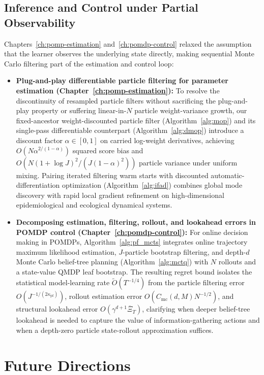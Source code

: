 \begin{aigenblock}
\subsection{Inference and Control under Partial Observability}

Chapters~\ref{ch:pomp-estimation} and~\ref{ch:pomdp-control} relaxed the assumption that the learner observes the underlying state directly, making sequential Monte Carlo filtering part of the estimation and control loop:
\begin{itemize}
\item \textbf{Plug-and-play differentiable particle filtering for parameter estimation (Chapter~\ref{ch:pomp-estimation}):} To resolve the discontinuity of resampled particle filters without sacrificing the plug-and-play property or suffering linear-in-$N$ particle weight-variance growth, our fixed-ancestor weight-discounted particle filter (Algorithm~\ref{alg:mop}) and its single-pass differentiable counterpart (Algorithm~\ref{alg:dmop}) introduce a discount factor $\alpha \in [0,1]$ on carried log-weight derivatives, achieving $O(N\alpha^{2/(1-\alpha)})$ squared score bias and $O(N(1+\log J)^2/(J(1-\alpha)^2))$ particle variance under uniform mixing. Pairing iterated filtering warm starts with discounted automatic-differentiation optimization (Algorithm~\ref{alg:ifad}) combines global mode discovery with rapid local gradient refinement on high-dimensional epidemiological and ecological dynamical systems.
\item \textbf{Decomposing estimation, filtering, rollout, and lookahead errors in POMDP control (Chapter~\ref{ch:pomdp-control}):} For online decision making in POMDPs, Algorithm~\ref{alg:pf_mcts} integrates online trajectory maximum likelihood estimation, $J$-particle bootstrap filtering, and depth-$d$ Monte Carlo belief-tree planning (Algorithm~\ref{alg:mctq}) with $N$ rollouts and a state-value QMDP leaf bootstrap. The resulting regret bound isolates the statistical model-learning rate $\widetilde{O}(T^{-1/4})$ from the particle filtering error $O(J^{-1/(2\kappa_{\mathrm{pf}})})$, rollout estimation error $O(C_{\mathrm{mc}}(d,M) N^{-1/2})$, and structural lookahead error $O(\gamma^{d+1}\overline{\Xi}_T)$, clarifying when deeper belief-tree lookahead is needed to capture the value of information-gathering actions and when a depth-zero particle state-rollout approximation suffices.
\end{itemize}

\section{Future Directions}


\end{aigenblock}
